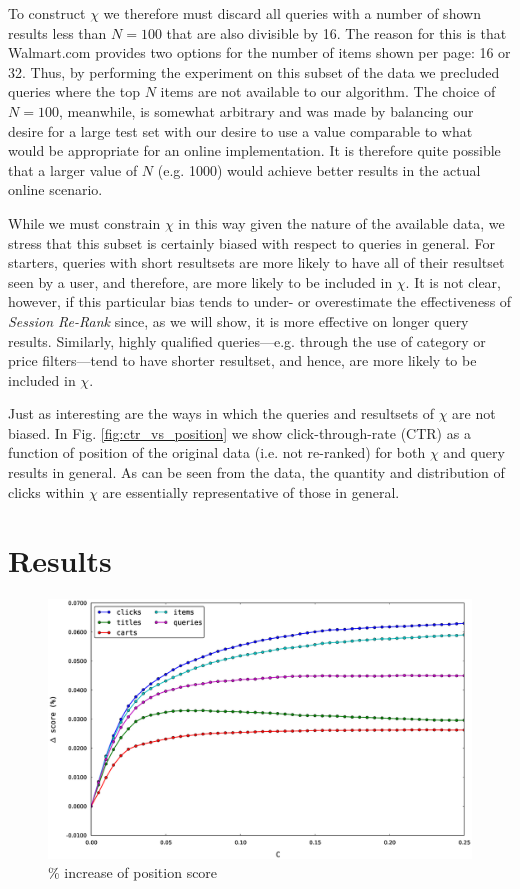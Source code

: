 \documentclass{article}
\begin{document}
To construct $\chi$ we therefore must discard all queries with a number of
shown results less than $N=100$ that are also divisible by 16. The reason for 
this is that Walmart.com provides two options for the number of items shown per
page: 16 or 32. Thus, by performing the experiment on this subset of the data we
precluded queries where the top $N$ items are not available to our algorithm.
The choice of $N=100$, meanwhile, is somewhat arbitrary and was made by balancing our desire
for a large test set with our desire to use a value comparable to what would be
appropriate for an online implementation. It is therefore quite possible that a
larger value of $N$ (e.g. 1000) would achieve better results in the actual
online scenario.

While we must constrain $\chi$ in this way given the nature of the available 
data, we stress that this subset is certainly biased with respect to queries 
in general. For starters, queries with short resultsets are more likely to 
have all of their resultset seen by a user, and therefore, are more likely to 
be included in $\chi$. It is not clear, however, if this particular bias
tends to under- or overestimate the effectiveness of {\em Session Re-Rank}
since, as we will show, it is more effective on longer query results. Similarly,
highly qualified queries---e.g. through the use of category or price filters---tend
to have shorter resultset, and hence, are more likely to be included in $\chi$.

Just as interesting are the ways in which the queries and resultsets of $\chi$
are not biased. In Fig. \ref{fig:ctr_vs_position} we show click-through-rate (CTR)
as a function of position of the original data (i.e. not re-ranked) for both
$\chi$ and query results in general. As can be seen from the data, the quantity
and distribution of clicks within $\chi$ are essentially representative of those
in general.

\section{Results}

\begin{figure}[htbp!]
\centering
\includegraphics[width=\textwidth]{000050_0.48chunk.k100.i2.n100.percent_increase_position_score.0-0.25.eps}
\caption{\% increase of position score}
    \label{fig:percent_increase_of_position_score}
\end{figure}
\end{document}
